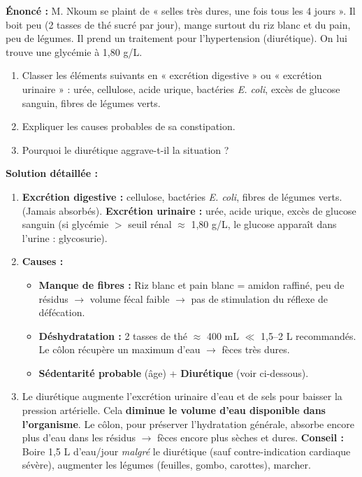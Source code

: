 \documentclass[11pt]{article}
\begin{document}
\begin{exoresolu}
\textbf{Énoncé :} M. Nkoum se plaint de « selles très dures, une fois tous les 4 jours ». Il boit peu (2 tasses de thé sucré par jour), mange surtout du riz blanc et du pain, peu de légumes. Il prend un traitement pour l'hypertension (diurétique). On lui trouve une glycémie à 1,80 g/L.
\begin{enumerate}
    \item Classer les éléments suivants en « excrétion digestive » ou « excrétion urinaire » : urée, cellulose, acide urique, bactéries \textit{E. coli}, excès de glucose sanguin, fibres de légumes verts.
    \item Expliquer les causes probables de sa constipation.
    \item Pourquoi le diurétique aggrave-t-il la situation ?
\end{enumerate}

\tcblower
\textbf{Solution détaillée :}
\begin{enumerate}
    \item \textbf{Excrétion digestive :} cellulose, bactéries \textit{E. coli}, fibres de légumes verts. (Jamais absorbés).
          \textbf{Excrétion urinaire :} urée, acide urique, excès de glucose sanguin (si glycémie $>$ seuil rénal $\approx$ 1,80 g/L, le glucose apparaît dans l'urine : glycosurie).
    \item \textbf{Causes :}
          \begin{itemize}
              \item \textbf{Manque de fibres :} Riz blanc et pain blanc = amidon raffiné, peu de résidus $\rightarrow$ volume fécal faible $\rightarrow$ pas de stimulation du réflexe de défécation.
              \item \textbf{Déshydratation :} 2 tasses de thé $\approx$ 400 mL $\ll$ 1,5--2 L recommandés. Le côlon récupère un maximum d'eau $\rightarrow$ fèces très dures.
              \item \textbf{Sédentarité probable} (âge) + \textbf{Diurétique} (voir ci-dessous).
          \end{itemize}
    \item Le diurétique augmente l'excrétion urinaire d'eau et de sels pour baisser la pression artérielle. Cela \textbf{diminue le volume d'eau disponible dans l'organisme}. Le côlon, pour préserver l'hydratation générale, absorbe encore plus d'eau dans les résidus $\rightarrow$ fèces encore plus sèches et dures. \textbf{Conseil :} Boire 1,5 L d'eau/jour \emph{malgré} le diurétique (sauf contre-indication cardiaque sévère), augmenter les légumes (feuilles, gombo, carottes), marcher.
\end{enumerate}
\end{exoresolu}
\end{document}
